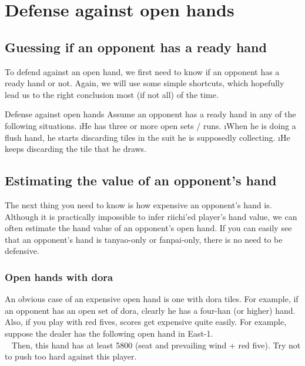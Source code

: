 {{\vfill

\section{Defense against open hands} \label{sec:defense_open}

\subsection{Guessing if an opponent has a ready hand}
To defend against an open hand, we first need to know if an opponent has a ready hand or not. Again, we will use some simple shortcuts, which hopefully lead us to the right conclusion most (if not all) of the time. 

\bigskip
\begin{itembox}[c]{Defense against open hands}
Assume an opponent has a ready hand in any of the following situations.
\be
\i He has three or more open sets / runs.
\i When he is doing a flush hand, he starts discarding tiles in the suit he is supposedly collecting.
\i He keeps discarding the tile that he draws.
\ee
\vsps
\end{itembox}
\bigskip

\subsection{Estimating the value of an opponent's hand}

The next thing you need to know is how expensive an opponent's hand is. Although it is practically impossible to infer riichi'ed player's hand value, we can often estimate the hand value of an opponent's open hand. If you can easily see that an opponent's hand is {\jap tanyao}-only or {\jap fanpai}-only, there is no need to be defensive.

\subsubsection*{Open hands with {\jap dora}}

An obvious case of an expensive open hand is one with {\jap dora} tiles. 
For example, if an opponent has an open set of {\jap dora}, clearly he has a four-{\jap han} (or higher) hand. Also, if you play with red fives, scores get expensive quite easily. For example, suppose the dealer has the following open hand in East-1.
\vspace{-20pt}
\bp
{}\\ \vspace{-16pt}
\rdong\dong\dong~\rfs{}
\ep
Then, this hand has at least 5800 (seat and prevailing wind + red five). Try not to push too hard against this player. 

}}
